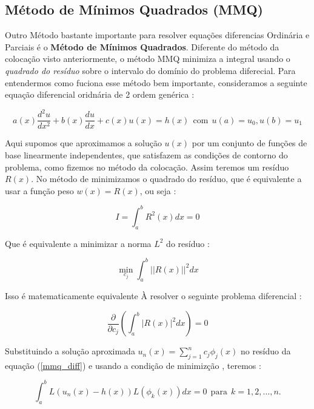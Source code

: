 \documentclass[a4paper, 12pt]{article}
\numberwithin{equation}{section}
\begin{document}
\subsection{Método de Mínimos Quadrados (MMQ)}

Outro Método bastante importante para resolver equações diferencias Ordinária e Parciais é o \textbf{Método de Mínimos Quadrados}.  
Diferente do método da colocação visto anteriormente, o método MMQ minimiza a integral usando o 
\textit{quadrado do resíduo} sobre o intervalo do domínio do problema diferecial.  Para entendermos como fuciona esse 
método bem importante, consideramos a seguinte equação diferencial oridnária de 2 ordem genérica :

\begin{equation}
    a(x) \dfrac{d^2u}{dx^2} + b(x)\dfrac{du}{dx} + c(x)u(x)  = h(x) \ \ \textrm{com} \ \ u(a) = u_0 ,  u(b) = u_1  \label{eq_governo2}
\end{equation}

Aqui supomos que aproximamos  a solução $u(x)$ por um conjunto de funções de base linearmente independentes, que satisfazem as condições de contorno do problema, 
como fizemos no método da colocação. Assim teremos um resíduo $R(x)$. No método de minimizamos o quadrado do resíduo,
que é equivalente a usar a função peso $w(x) = R(x)$, ou seja : 

\begin{equation}
  I =   \int_{a}^{b} R^2(x)dx = 0 \label{minimizacao2}
\end{equation}

Que é equivalente a minimizar a norma $L^2$ do resíduo : 

\begin{equation}
\min_{c_j} \int_{a}^{b} \Big| \Big| R(x) \Big| \Big|^2  dx
\end{equation}


Isso é matematicamente equivalente À resolver o seguinte problema diferencial : 

\begin{equation}
    \dfrac{\partial }{\partial c_j} \left(\int_{a}^{b} \big|R(x)\big|^2 dx \right) = 0 \label{mmq_diff}
\end{equation}

Substituindo a solução aproximada $u_n(x) = \sum_{j = 1}^{n} c_j \phi_j(x)$ no resíduo da equação (\ref{mmq_diff}) e usando a condição de minimizção , teremos : 

\begin{equation}
    \int_{a}^{b} L(u_n(x) - h(x)) L\left(\phi_k(x)\right) dx = 0  \ \ \textrm{para} \ \ k = 1,2,\ldots,n. 
\end{equation}
\end{document}
